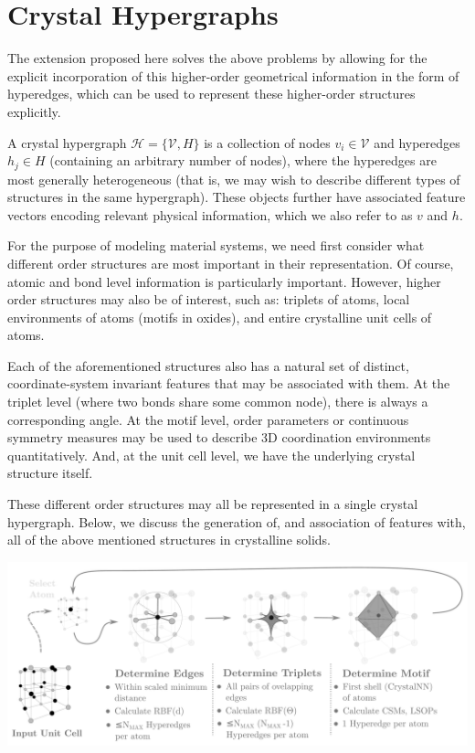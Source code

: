 \documentclass[10pt,a4paper]{article}
\begin{document}
\section{Crystal Hypergraphs}
The extension proposed here solves the above problems by allowing for the explicit incorporation of this higher-order geometrical information in the form of hyperedges, which can be used to represent these higher-order structures explicitly.



A crystal hypergraph $\mathcal{H}=\lbrace\mathcal{V}, \mathit{H} \rbrace$ is a collection of nodes $v_i\in \mathcal{V}$ and hyperedges $h_j\in \mathit{H}$ (containing an arbitrary number of nodes), where the hyperedges are most generally heterogeneous (that is, we may wish to describe different types of structures in the same hypergraph). These objects further have associated feature vectors encoding relevant physical information, which we also refer to as $v$ and $h$.

For the purpose of modeling material systems, we need first consider what different order structures are most important in their representation. Of course, atomic and bond level information is particularly important. However, higher order structures may also be of interest, such as: triplets of atoms, local environments of atoms (motifs in oxides), and entire crystalline unit cells of atoms.

Each of the aforementioned structures also has a natural set of distinct, coordinate-system invariant features that may be associated with them. At the triplet level (where two bonds share some common node), there is always a corresponding angle. At the motif level, order parameters \cite{orderparam1, orderparam2} or continuous symmetry measures \cite{csm_polyhedra, chemenv} may be used to describe 3D coordination environments quantitatively. And, at the unit cell level, we have the underlying crystal structure itself.


These different order structures may all be represented in a single crystal hypergraph. Below, we discuss the generation of, and association of features with, all of the above mentioned structures in crystalline solids. 

\begin{center}
\includegraphics[scale=0.27]{crystal_hgraph_ex.pdf}
\end{center}
\end{document}
